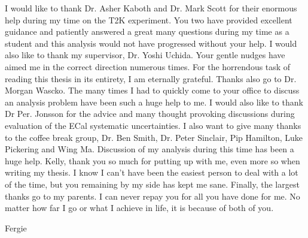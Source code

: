 \begin{acknowledgements}
\noindent I would like to thank Dr. Asher Kaboth and Dr. Mark Scott for their enormous help during my time on the T2K experiment.  You two have provided excellent guidance and patiently answered a great many questions during my time as a student and this analysis would not have progressed without your help.
\newline
\newline
I would also like to thank my supervisor, Dr. Yoshi Uchida.  Your gentle nudges have aimed me in the correct direction numerous times.  For the horrendous task of reading this thesis in its entirety, I am eternally grateful.
\newline
\newline
Thanks also go to Dr. Morgan Wascko.  The many times I had to quickly come to your office to discuss an analysis problem have been such a huge help to me.
\newline
\newline
I would also like to thank Dr Per. Jonsson for the advice and many thought provoking discussions during evaluation of the ECal systematic uncertainties.
\newline
\newline
I also want to give many thanks to the coffee break group, Dr. Ben Smith, Dr. Peter Sinclair, Pip Hamilton, Luke Pickering and Wing Ma.  Discussion of my analysis during this time has been a huge help.
\newline
\newline
Kelly, thank you so much for putting up with me, even more so when writing my thesis.  I know I can't have been the easiest person to deal with a lot of the time, but you remaining by my side has kept me sane.
\newline
\newline
Finally, the largest thanks go to my parents.  I can never repay you for all you have done for me.  No matter how far I go or what I achieve in life, it is because of both of you.
\end{acknowledgements}

%

\tableofcontents

\listoffigures
\listoftables



%
  {Fergie}
\thispagestyle{empty}
